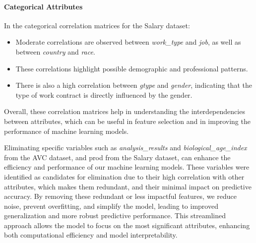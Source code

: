\documentclass[a4paper,12pt]{article}
\begin{document}
\paragraph{Categorical Attributes}
In the categorical correlation matrices for the Salary dataset:
\begin{itemize}
    \item Moderate correlations are observed between \textit{work\_type} and \textit{job}, as well as between \textit{country} and \textit{race}.
    \item These correlations highlight possible demographic and professional patterns.
    \item There is also a high correlation between \textit{gtype} and \textit{gender}, indicating that the type of work contract is directly influenced by the gender.
\end{itemize}

Overall, these correlation matrices help in understanding the interdependencies between attributes, which can be useful in feature selection and in improving the performance of machine learning models.

Eliminating specific variables such as \textit{analysis\_results} and \textit{biological\_age\_index} from the AVC dataset, and prod from the Salary dataset, can enhance the efficiency and performance of our machine learning models. These variables were identified as candidates for elimination due to their high correlation with other attributes, which makes them redundant, and their minimal impact on predictive accuracy. By removing these redundant or less impactful features, we reduce noise, prevent overfitting, and simplify the model, leading to improved generalization and more robust predictive performance. This streamlined approach allows the model to focus on the most significant attributes, enhancing both computational efficiency and model interpretability.
\end{document}
